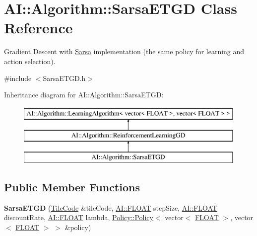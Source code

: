 \hypertarget{classAI_1_1Algorithm_1_1SarsaETGD}{\section{A\+I\+:\+:Algorithm\+:\+:Sarsa\+E\+T\+G\+D Class Reference}
\label{classAI_1_1Algorithm_1_1SarsaETGD}
}


Gradient Descent with \hyperlink{classAI_1_1Algorithm_1_1Sarsa}{Sarsa} implementation (the same policy for learning and action selection).  




{\ttfamily \#include $<$Sarsa\+E\+T\+G\+D.\+h$>$}

Inheritance diagram for A\+I\+:\+:Algorithm\+:\+:Sarsa\+E\+T\+G\+D\+:\begin{figure}[H]
\begin{center}
\leavevmode
\includegraphics[height=3.000000cm]{classAI_1_1Algorithm_1_1SarsaETGD}
\end{center}
\end{figure}
\subsection*{Public Member Functions}
\begin{DoxyCompactItemize}
\item 
\hypertarget{classAI_1_1Algorithm_1_1SarsaETGD_a51da05d1ec0823c06770eaf4dc3ccdee}{{\bfseries Sarsa\+E\+T\+G\+D} (\hyperlink{classAI_1_1Algorithm_1_1TileCode}{Tile\+Code} \&tile\+Code, \hyperlink{namespaceAI_a41b74884a20833db653dded3918e05c3}{A\+I\+::\+F\+L\+O\+A\+T} step\+Size, \hyperlink{namespaceAI_a41b74884a20833db653dded3918e05c3}{A\+I\+::\+F\+L\+O\+A\+T} discount\+Rate, \hyperlink{namespaceAI_a41b74884a20833db653dded3918e05c3}{A\+I\+::\+F\+L\+O\+A\+T} lambda, \hyperlink{classAI_1_1Algorithm_1_1Policy_1_1Policy}{Policy\+::\+Policy}$<$ vector$<$ \hyperlink{namespaceAI_a41b74884a20833db653dded3918e05c3}{F\+L\+O\+A\+T} $>$, vector$<$ \hyperlink{namespaceAI_a41b74884a20833db653dded3918e05c3}{F\+L\+O\+A\+T} $>$ $>$ \&policy)}\label{classAI_1_1Algorithm_1_1SarsaETGD_a51da05d1ec0823c06770eaf4dc3ccdee}

\end{DoxyCompactItemize}
